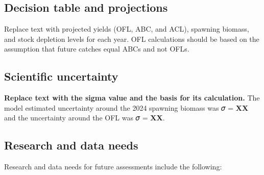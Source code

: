 \documentclass[11pt,
  english,
  letterpaper,
]{article}
\begin{document}
\hypertarget{decision-table-and-projections}{%
\subsection*{Decision table and projections}\label{decision-table-and-projections}}

Replace text with projected yields (OFL, ABC, and ACL), spawning biomass, and stock depletion levels for each year. OFL calculations should be based on the assumption that future catches equal ABCs and not OFLs.

\hypertarget{scientific-uncertainty}{%
\subsection*{Scientific uncertainty}\label{scientific-uncertainty}}

\textbf{Replace text with the sigma value and the basis for its calculation.} The model estimated uncertainty around the 2024 spawning biomass was 𝜎 = \textbf{XX} and the uncertainty around the OFL was 𝜎 = \textbf{XX}.

\hypertarget{research-and-data-needs}{%
\subsection*{Research and data needs}\label{research-and-data-needs}}

Research and data needs for future assessments include the following:
\end{document}
